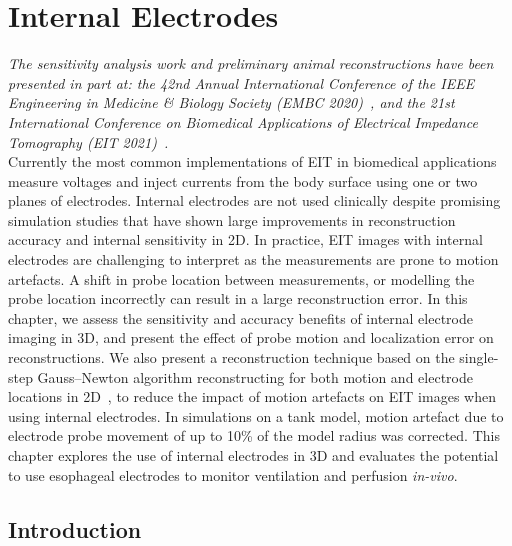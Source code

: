 \chapter{Internal Electrodes}
\label{chap:chapter-6}
\emph{The sensitivity analysis work and preliminary animal reconstructions have
 been presented in part at: the 42nd Annual International Conference of the IEEE Engineering 
 in Medicine \& Biology Society (EMBC 2020)~\parencite{stowe_effect_2020}, and the 21st International Conference on Biomedical 
 Applications of Electrical Impedance Tomography (EIT 2021)~\parencite{stowe_using_2021}.} \\

Currently the most common implementations of EIT in biomedical applications
measure voltages and inject currents from the body surface using 
one or two planes of electrodes. Internal electrodes are not used clinically
despite promising simulation studies that have shown large improvements 
in reconstruction accuracy and internal sensitivity in 2D. 
In practice, EIT images with internal electrodes are challenging to interpret 
as the measurements are prone to motion artefacts. 
A shift in probe location between measurements,
or modelling the probe location incorrectly can result in a 
large reconstruction error. 
In this chapter, we assess the sensitivity and accuracy benefits 
of internal electrode imaging in 3D, and present 
the effect of probe motion and localization error on reconstructions.
We also present a reconstruction technique based on the single-step 
Gauss–Newton algorithm reconstructing for both motion and 
electrode locations in 2D~\parencite{soleimani_imaging_2006},
to reduce the impact of motion artefacts
on EIT images when using internal electrodes.
In simulations on a tank model, 
motion artefact due to electrode probe movement of up to 10\% of the 
model radius was corrected.  
This chapter explores the use of internal electrodes 
in 3D and evaluates the potential to use esophageal electrodes to monitor
ventilation and perfusion \emph{in-vivo}. 

\section{Introduction}

